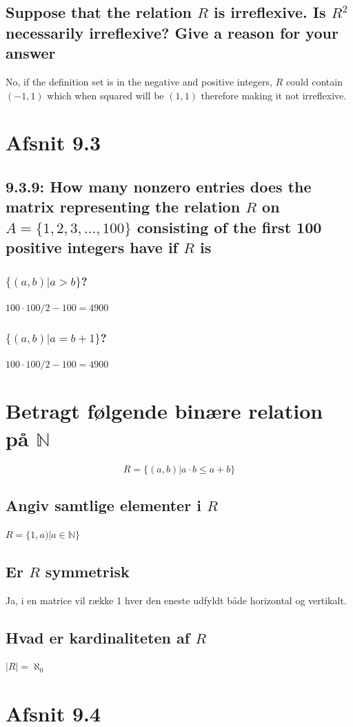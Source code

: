 \documentclass[12pt, a4paper]{report}
\begin{document}
				\subsection{Suppose that the relation $R$ is irreflexive. Is $R^2$ necessarily irreflexive? Give a reason for your answer}
					No, if the definition set is in the negative and positive integers, $R$ could contain $(-1,1)$ which when squared will be $(1,1)$ therefore making it not irreflexive.
			\section{Afsnit 9.3}
				\setcounter{subsection}{8}
				\subsection{9.3.9: How many nonzero entries does the matrix representing the relation $R$ on $A=\{1,2,3,...,100\}$ consisting of the first 100 positive integers have if $R$ is}
					\subsubsection{$\{(a,b)|a>b\}$?}
						$100\cdot 100 /2-100=4900$
					\setcounter{subsubsection}{2}
					\subsubsection{$\{(a,b)|a=b+1\}$?}
						$100\cdot 100 /2-100=4900$
			\section{Betragt følgende binære relation på $\mathbb{N}$}
			$$R=\{(a,b)|a\cdot b\leq a+b\}$$
				\subsection{Angiv samtlige elementer i $R$}
					$R=\{1,a)|a\in \mathbb{N}\}$
				\subsection{Er $R$ symmetrisk}
					Ja, i en matrice vil række 1 hver den eneste udfyldt  både horizontal og vertikalt.\\
				\subsection{Hvad er kardinaliteten af $R$}
					$|R|=\aleph_0$
			\setcounter{section}{0}
			\section{Afsnit 9.4}				
				\setcounter{subsection}{0}
\end{document}
